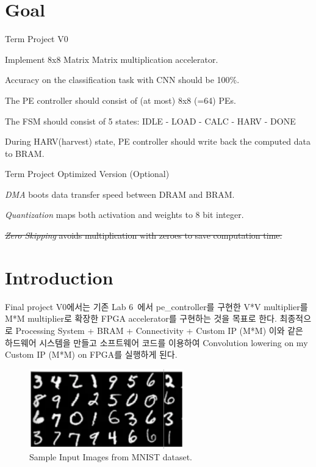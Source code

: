 \documentclass{article}
\newcommand{\red}[1]{{\color{red} #1}}
\begin{document}
\pagestyle{fancy}

\section*{Goal}

\begin{itemize*}
\item Term Project V0
\begin{itemize*}
\item Implement 8x8 Matrix Matrix multiplication accelerator.
\begin{itemize*}
\item Accuracy on the classification task with CNN should be 100\%.
\item The PE controller should consist of (at most) 8x8 (=64) PEs.
\item The FSM should consist of 5 states: IDLE - LOAD - CALC - HARV - DONE
\item During HARV(harvest) state, PE controller should write back the computed data to BRAM.
\end{itemize*}
\end{itemize*}
\item Term Project Optimized Version \red{(Optional)}
\begin{itemize*}
\item \textit{DMA} boots data transfer speed between DRAM and BRAM.
\item \textit{Quantization} maps both activation and weights to 8 bit integer.
\item \st{\textit{Zero Skipping} avoids multiplication with zeroes to save computation time.}
\end{itemize*}
\end{itemize*}

\section{Introduction}
\label{sec:intro}
Final project V0에서는 기존 Lab 6~\cite{lab6}에서 pe\_controller를 구현한 V*V multiplier를 M*M multiplier로 확장한 FPGA accelerator를 구현하는 것을 목표로 한다. 최종적으로 Processing System + BRAM + Connectivity + Custom IP (M*M) 이와 같은 하드웨어 시스템을 만들고 소프트웨어 코드를 이용하여 Convolution lowering on my Custom IP (M*M) on FPGA를 실행하게 된다. ~\cite{zhai2016mlp}\\

\begin{figure}[ht]
	\centering
	\includegraphics[width=0.6\textwidth]{fig/mnist.png}
\caption{Sample Input Images from MNIST dataset.}
\label{fig1}
\end{figure}
\end{document}
